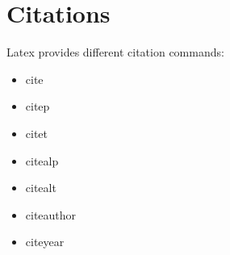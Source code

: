 \section{Citations}
Latex provides different citation commands:
\begin{itemize}
    \item cite \cite{Abendroth_ADEM(2004)}
    \item citep \citep{Abendroth_ADEM(2017)}
    \item citet \citet{Abendroth_CMS(2003)}
    \item citealp \citealp{Abendroth_EFM(2006)}
    \item citealt \citealt{Abendroth_IJMS(2024)}
    \item citeauthor \citeauthor{Abendroth_TM(2020)}
    \item citeyear \citeyear{Altenbach2014}
\end{itemize}
